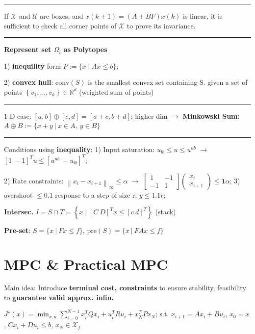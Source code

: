 \documentclass[10pt,a4paper,landscape]{article}
\newcommand{\quadRule}{\vspace{-3pt}\rule{0.23\textwidth}{0.4pt}}
\begin{document}
\begin{multicols*}{4}
\quadRule

If $\mathcal{X}$ and $\mathcal{U}$ are boxes, and $x(k+1) = (A+BF)x(k)$ is linear, it is sufficient to check all corner points of $\mathcal{X}$ to prove its invariance.

\quadRule

\textbf{Represent set $\Omega_i$ as Polytopes}

1) \textbf{inequility} form $P:=\{x \mid A x \leq b\}$; 

2) \textbf{convex hull}: $\mathrm{conv}(S)$ is the smallest convex set containing S. given a set of points $\left\{v_{1}, \ldots, v_{k}\right\} \in  \mathbb{R}^{d}$ (weighted sum of points)

\quadRule

1-D case: $[a, b] \oplus[c, d]=[a+c, b+d]$; higher dim $\rightarrow$
\textbf{Minkowski Sum:} $ A \oplus B := \{ x+y \:|\: x \in A, \: y \in B \}$

\quadRule

Conditions using \textbf{inequality}: 
1) Input saturation: $
u_{l b} \leq u \leq u^{u b}$  $\rightarrow$ $\left[1 \ -1 \right]^T u \leq\left[u^{u b} \ -u_{l b}\right]^T$; 

2) Rate constraints: 
$ \left\|x_{i}-x_{i+1}\right\|_{\infty} \leq \alpha$ 
$\rightarrow$ 
${\left[\begin{array}{cc}
1 & -1 \\
-1 & 1
\end{array}\right]\left(\begin{array}{c}
x_{i} \\
x_{i+1}
\end{array}\right) \leq \mathbf{1} \alpha}$; 
3) overshoot $\leq 0.1$ response to a step of size r: $y \leq {1.1r}$;

\textbf{Intersec.}
$I=S \cap T =\left\{x \mid
\left[C \ D \right]^T x \leq\left[c \ d \right]^T\right\}$ (stack)

\textbf{Pre-set}: $S=\{ x \:|\: Fx\leq f\}$, $\mathrm{pre}(S)= \{ x \:|\: FAx \leq f \}$

\section{MPC \& Practical MPC}
Main idea: Introduce \textbf{terminal cost, constraints} to ensure stability, feasibility to \textbf{guarantee valid approx. infin.}

$J^{\star}(x)=\min  _{x, u} \sum_{i=0}^{N-1} x_{i}^{T} Q x_{i}+u_{i}^{T} R u_{i} + x_N^T P x_N$; s.t.  $x_{i+1} =A x_{i}+B u_{i}$, $x_{0} =x$, $C x_{i}+D u_{i} \leq b$, $x_N \in \mathcal{X}_f$


\end{multicols*}
\end{document}
